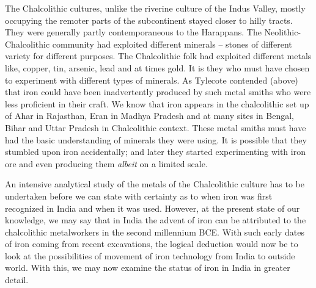 {The Chalcolithic cultures, unlike the riverine culture of the Indus Valley, mostly occupying the remoter parts of the subcontinent stayed closer to hilly tracts. They were generally partly contemporaneous to the Harappans. The Neolithic-Chalcolithic community had exploited different minerals – stones of different variety for different purposes. The Chalcolithic folk had exploited different metals like, copper, tin, arsenic, lead and at times gold. It is they who must have chosen to experiment with different types of minerals. As Tylecote contended (above) that iron could have been inadvertently produced by such metal smiths who were less proficient in their craft. We know that iron appears in the chalcolithic set up of Ahar in Rajasthan, Eran in Madhya Pradesh and at many sites in Bengal, Bihar and Uttar Pradesh in Chalcolithic context. These metal smiths must have had the basic understanding of minerals they were using. It is possible that they stumbled upon iron accidentally; and later they started experimenting with iron ore and even producing them \textit{albeit} on a limited scale.

An intensive analytical study of the metals of the Chalcolithic culture has to be undertaken before we can state with certainty as to when iron was first recognized in India and when it was used. However, at the present state of our knowledge, we may say that in India the advent of iron can be attributed to the chalcolithic metalworkers in the second millennium BCE. With such early dates of iron coming from recent excavations, the logical deduction would now be to look at the possibilities of movement of iron technology from India to outside world. With this, we may now examine the status of iron in India in greater detail.

\vspace{-.3cm}


\label{endchapter2}



}
